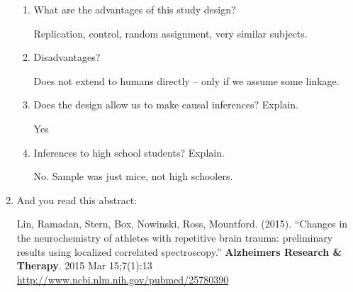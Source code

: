 \begin{enumerate}
\begin{enumerate}
\item  What are the advantages of this study design?
\begin{students}
 \vfill
\end{students}

\begin{key}
  Replication, control, random assignment, very similar subjects.
\end{key}


\item Disadvantages?
\begin{students}
 \vfill
\end{students}

\begin{key}
 Does not extend to humans directly -- only if we assume some linkage.
\end{key}



\item Does the design allow us to make causal inferences? Explain.
\begin{students}
 \vspace{2cm}
\end{students}

\begin{key}
Yes
\end{key}



\item Inferences to high school students? Explain.

\begin{students}
\vspace*{1.6cm}
\newpage
\end{students}

\begin{key}  No. Sample was just mice, not high schoolers.
\end{key}



\end{enumerate}

  \item And you read this abstract:

Lin, Ramadan, Stern, Box, Nowinski, Ross, Mountford. (2015).
``Changes in the neurochemistry of athletes with repetitive brain trauma: preliminary results using localized correlated spectroscopy.''
{\bf Alzheimers Research \& Therapy}. 2015 Mar 15;7(1):13
\url{http://www.ncbi.nlm.nih.gov/pubmed/25780390}


\end{enumerate}
